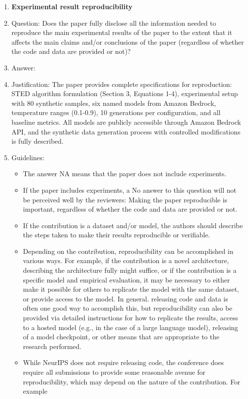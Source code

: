 \documentclass{article}
\begin{document}
\begin{enumerate}
    \item {\bf Experimental result reproducibility}
    \item[] Question: Does the paper fully disclose all the information needed to reproduce the main experimental results of the paper to the extent that it affects the main claims and/or conclusions of the paper (regardless of whether the code and data are provided or not)?
    \item[] Answer: \answerYes{} %
    \item[] Justification: \justification The paper provides complete specifications for reproduction: STED algorithm formulation (Section 3, Equations 1-4), experimental setup with 80 synthetic samples, six named models from Amazon Bedrock, temperature ranges (0.1-0.9), 10 generations per configuration, and all baseline metrics. All models are publicly accessible through Amazon Bedrock API, and the synthetic data generation process with controlled modifications is fully described.{}
    \item[] Guidelines:
    \begin{itemize}
        \item The answer NA means that the paper does not include experiments.
        \item If the paper includes experiments, a No answer to this question will not be perceived well by the reviewers: Making the paper reproducible is important, regardless of whether the code and data are provided or not.
        \item If the contribution is a dataset and/or model, the authors should describe the steps taken to make their results reproducible or verifiable. 
        \item Depending on the contribution, reproducibility can be accomplished in various ways. For example, if the contribution is a novel architecture, describing the architecture fully might suffice, or if the contribution is a specific model and empirical evaluation, it may be necessary to either make it possible for others to replicate the model with the same dataset, or provide access to the model. In general. releasing code and data is often one good way to accomplish this, but reproducibility can also be provided via detailed instructions for how to replicate the results, access to a hosted model (e.g., in the case of a large language model), releasing of a model checkpoint, or other means that are appropriate to the research performed.
        \item While NeurIPS does not require releasing code, the conference does require all submissions to provide some reasonable avenue for reproducibility, which may depend on the nature of the contribution. For example

\end{itemize}
\end{enumerate}
\end{document}
